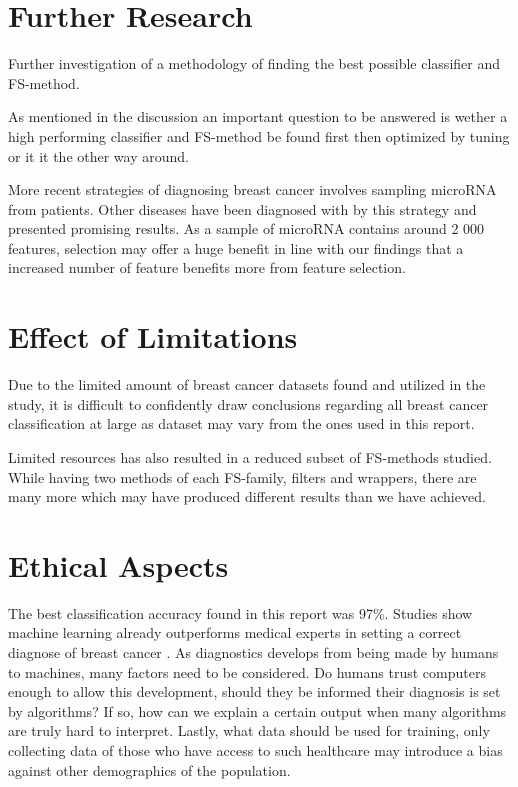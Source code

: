 \section{Further Research}

Further investigation of a methodology of finding the best possible classifier and FS-method.

As mentioned in the discussion an important question to be answered is wether a high performing classifier and FS-method be found first then optimized by tuning or it it the other way around.

More recent strategies of diagnosing breast cancer involves sampling microRNA from patients. Other diseases have been diagnosed with by this strategy and presented promising results. As a sample of microRNA contains around 2 000 features, selection may offer a huge benefit in line with our findings that a increased number of feature benefits more from feature selection.

\section{Effect of Limitations}

Due to the limited amount of breast cancer datasets found and utilized in the study, it is difficult to confidently draw conclusions regarding all breast cancer classification at large as dataset may vary from the ones used in this report.

Limited resources has also resulted in a reduced subset of FS-methods studied. While having two methods of each FS-family, filters and wrappers, there are many more which may have produced different results than we have achieved.


\section{Ethical Aspects}

The best classification accuracy found in this report was 97\%. Studies show machine learning already outperforms medical experts in setting a correct diagnose of breast cancer \parencite{fnab}. As diagnostics develops from being made by humans to machines, many factors need to be considered. Do humans trust computers enough to allow this development, should they be informed their diagnosis is set by algorithms? If so, how can we explain a certain output when many algorithms are truly hard to interpret. Lastly, what data should be used for training, only collecting data of those who have access to such healthcare may introduce a bias against other demographics of the population.

